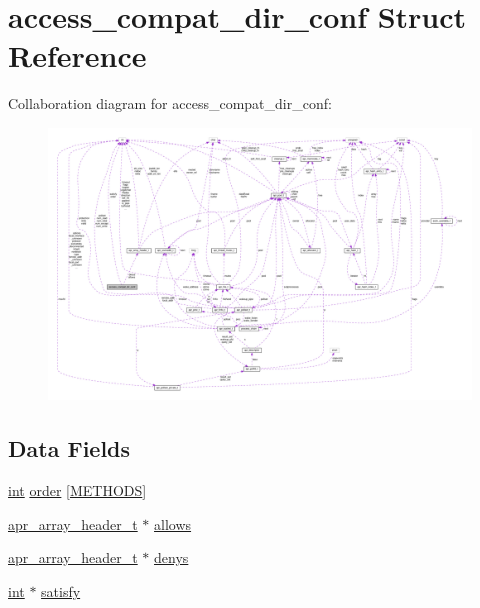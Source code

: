 \hypertarget{structaccess__compat__dir__conf}{}\section{access\+\_\+compat\+\_\+dir\+\_\+conf Struct Reference}
\label{structaccess__compat__dir__conf}


Collaboration diagram for access\+\_\+compat\+\_\+dir\+\_\+conf\+:
\nopagebreak
\begin{figure}[H]
\begin{center}
\leavevmode
\includegraphics[width=350pt]{structaccess__compat__dir__conf__coll__graph}
\end{center}
\end{figure}
\subsection*{Data Fields}
\begin{DoxyCompactItemize}
\item 
\hyperlink{pcre_8txt_a42dfa4ff673c82d8efe7144098fbc198}{int} \hyperlink{structaccess__compat__dir__conf_aaaec8797e301727b8d56415e8d16ec8e}{order} \mbox{[}\hyperlink{group__Methods_ga450901c43a43e4dd81eba1e9e229d3a1}{M\+E\+T\+H\+O\+DS}\mbox{]}
\item 
\hyperlink{structapr__array__header__t}{apr\+\_\+array\+\_\+header\+\_\+t} $\ast$ \hyperlink{structaccess__compat__dir__conf_a328d57b57a2ccb68c18f11beb33368bb}{allows}
\item 
\hyperlink{structapr__array__header__t}{apr\+\_\+array\+\_\+header\+\_\+t} $\ast$ \hyperlink{structaccess__compat__dir__conf_afb1dfc63e7b4dda5b82d5ef234689604}{denys}
\item 
\hyperlink{pcre_8txt_a42dfa4ff673c82d8efe7144098fbc198}{int} $\ast$ \hyperlink{structaccess__compat__dir__conf_abf82df3781b9b6d564b358d873288428}{satisfy}
\end{DoxyCompactItemize}


